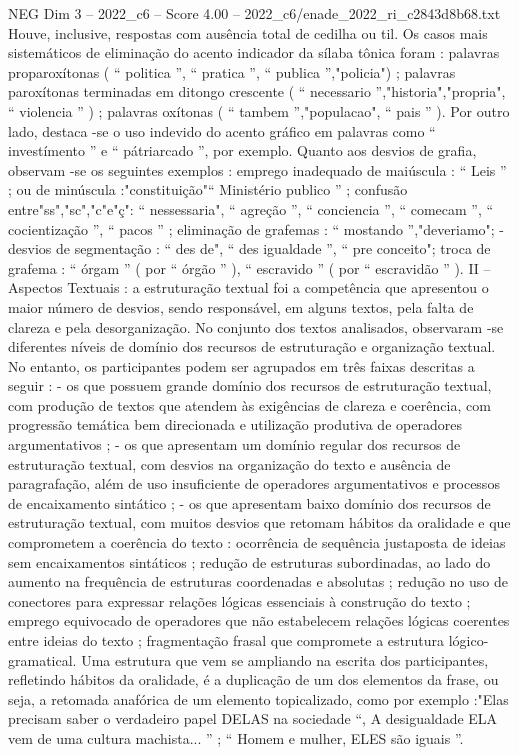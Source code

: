 \begin{textsample}{NEG Dim 3 – 2022\_c6 – Score 4.00 – 2022\_c6/enade\_2022\_ri\_c2843d8b68.txt}
Houve, inclusive, respostas com ausência total de cedilha ou til.
Os casos mais sistemáticos de eliminação do acento indicador da sílaba tônica foram : palavras proparoxítonas ( “ politica ”, “ pratica ”, “ publica ”,"policia") ; palavras paroxítonas terminadas em ditongo crescente ( “ necessario ”,"historia","propria", “ violencia ” ) ; palavras oxítonas ( “ tambem ”,"populacao", “ pais ” ).
Por outro lado, destaca -se o uso indevido do acento gráfico em palavras como “ investímento ” e “ pátriarcado ”, por exemplo.
Quanto aos desvios de grafia, observam -se os seguintes exemplos : emprego inadequado de maiúscula : “ Leis ” ; ou de minúscula :"constituição"“ Ministério publico ” ; confusão entre"ss","sc","c"e"ç": “ nessessaria", “ agreção ”, “ conciencia ”, “ comecam ”, “ cocientização ”, “ pacos ” ; eliminação de grafemas : “ mostando ”,"deveriamo"; - desvios de segmentação : “ des de", “ des igualdade ”, “ pre conceito"; troca de grafema : “ órgam ” ( por “ órgão ” ), “ escravido ” ( por “ escravidão ” ).
II – Aspectos Textuais : a estruturação textual foi a competência que apresentou o maior número de desvios, sendo responsável, em alguns textos, pela falta de clareza e pela desorganização.
No conjunto dos textos analisados, observaram -se diferentes níveis de domínio dos recursos de estruturação e organização textual.
No entanto, os participantes podem ser agrupados em três faixas descritas a seguir : - os que possuem grande domínio dos recursos de estruturação textual, com produção de textos que atendem às exigências de clareza e coerência, com progressão temática bem direcionada e utilização produtiva de operadores argumentativos ; - os que apresentam um domínio regular dos recursos de estruturação textual, com desvios na organização do texto e ausência de paragrafação, além de uso insuficiente de operadores argumentativos e processos de encaixamento sintático ; - os que apresentam baixo domínio dos recursos de estruturação textual, com muitos desvios que retomam hábitos da oralidade e que comprometem a coerência do texto : ocorrência de sequência justaposta de ideias sem encaixamentos sintáticos ; redução de estruturas subordinadas, ao lado do aumento na frequência de estruturas coordenadas e absolutas ; redução no uso de conectores para expressar relações lógicas essenciais à construção do texto ; emprego equivocado de operadores que não estabelecem relações lógicas coerentes entre ideias do texto ; fragmentação frasal que compromete a estrutura lógico-gramatical.
Uma estrutura que vem se ampliando na escrita dos participantes, refletindo hábitos da oralidade, é a duplicação de um dos elementos da frase, ou seja, a retomada anafórica de um elemento topicalizado, como por exemplo :"Elas precisam saber o verdadeiro papel DELAS na sociedade “, A desigualdade ELA vem de uma cultura machista... ” ; “ Homem e mulher, ELES são iguais ”.

\end{textsample}
